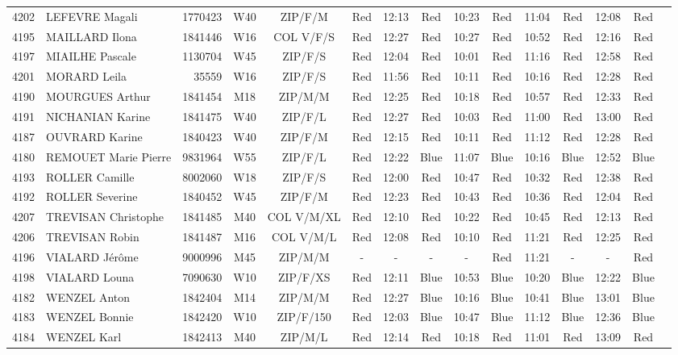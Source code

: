 \documentclass{report}
\begin{document}
\begin{longtable}{|c|l|r|c|c|*{5}{cc|}}
    4202 & LEFEVRE Magali & 1770423 & W40 & ZIP/F/M & Red & 12:13 & Red & 10:23 & Red & 11:04 & Red & 12:08 & Red &  \\
    4195 & MAILLARD Ilona & 1841446 & W16 & COL V/F/S & Red & 12:27 & Red & 10:27 & Red & 10:52 & Red & 12:16 & Red &  \\
    4197 & MIAILHE Pascale & 1130704 & W45 & ZIP/F/S & Red & 12:04 & Red & 10:01 & Red & 11:16 & Red & 12:58 & Red &  \\
    4201 & MORARD Leila & 35559 & W16 & ZIP/F/S & Red & 11:56 & Red & 10:11 & Red & 10:16 & Red & 12:28 & Red &  \\
    4190 & MOURGUES Arthur & 1841454 & M18 & ZIP/M/M & Red & 12:25 & Red & 10:18 & Red & 10:57 & Red & 12:33 & Red &  \\
    4191 & NICHANIAN Karine & 1841475 & W40 & ZIP/F/L & Red & 12:27 & Red & 10:03 & Red & 11:00 & Red & 13:00 & Red &  \\
    4187 & OUVRARD Karine & 1840423 & W40 & ZIP/F/M & Red & 12:15 & Red & 10:11 & Red & 11:12 & Red & 12:28 & Red &  \\
    4180 & REMOUET Marie Pierre & 9831964 & W55 & ZIP/F/L & Red & 12:22 & Blue & 11:07 & Blue & 10:16 & Blue & 12:52 & Blue &  \\
    4193 & ROLLER Camille & 8002060 & W18 & ZIP/F/S & Red & 12:00 & Red & 10:47 & Red & 10:32 & Red & 12:38 & Red &  \\
    4192 & ROLLER Severine & 1840452 & W45 & ZIP/F/M & Red & 12:23 & Red & 10:43 & Red & 10:36 & Red & 12:04 & Red &  \\
    4207 & TREVISAN Christophe & 1841485 & M40 & COL V/M/XL & Red & 12:10 & Red & 10:22 & Red & 10:45 & Red & 12:13 & Red &  \\
    4206 & TREVISAN Robin & 1841487 & M16 & COL V/M/L & Red & 12:08 & Red & 10:10 & Red & 11:21 & Red & 12:25 & Red &  \\
    4196 & VIALARD Jérôme & 9000996 & M45 & ZIP/M/M & - &  - & - &  - & Red & 11:21 & - &  - & Red &  \\
    4198 & VIALARD Louna & 7090630 & W10 & ZIP/F/XS & Red & 12:11 & Blue & 10:53 & Blue & 10:20 & Blue & 12:22 & Blue &  \\
    4182 & WENZEL Anton & 1842404 & M14 & ZIP/M/M & Red & 12:27 & Blue & 10:16 & Blue & 10:41 & Blue & 13:01 & Blue &  \\
    4183 & WENZEL Bonnie & 1842420 & W10 & ZIP/F/150 & Red & 12:03 & Blue & 10:47 & Blue & 11:12 & Blue & 12:36 & Blue &  \\
    4184 & WENZEL Karl & 1842413 & M40 & ZIP/M/L & Red & 12:14 & Red & 10:18 & Red & 11:01 & Red & 13:09 & Red &  \\
  \end{longtable}
\end{document}
